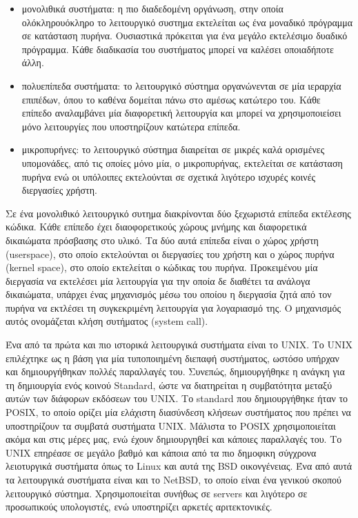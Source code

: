 \begin{itemize}
	\item μονολιθικά συστήματα: η πιο διαδεδομένη οργάνωση, στην οποία
		ολόκληρουόκληρο το λειτουργικό συστημα εκτελείται ως ένα
		μοναδικό πρόγραμμα σε κατάσταση πυρήνα. Ουσιαστικά πρόκειται για
		ένα μεγάλο εκτελέσιμο δυαδικό πρόγραμμα. Κάθε διαδικασία του
		συστήματος μπορεί να καλέσει οποιαδήποτε άλλη. 
	\item πολυεπίπεδα συστήματα: το λειτουργικό σύστημα οργανώνενται σε μία
		ιεραρχία επιπέδων, όπου το καθένα δομείται πάνω στο αμέσως
		κατώτερο του. Κάθε επίπεδο αναλαμβάνει μία διαφορετική
		λειτουργία και μπορεί να χρησιμοποιείσει μόνο λειτουργίες που
		υποστηρίζουν κατώτερα επίπεδα.
	\item μικροπυρήνες: το λειτουργικό σύστημα διαιρείται σε μικρές καλά
		ορισμένες υπομονάδες, από τις οποίες μόνο μία, ο μικροπυρήνας,
		εκτελείται σε κατάσταση πυρήνα ενώ οι υπόλοιπες εκτελούνται σε
		σχετικά λιγότερο ισχυρές κοινές διεργασίες χρήστη.
\end{itemize}

Σε ένα μονολιθικό λειτουργικό συτημα διακρίνονται δύο ξεχωριστά επίπεδα
εκτέλεσης κώδικα. Κάθε επίπεδο έχει διαοφορετικούς χώρους μνήμης και διαφορετικά
δικαιώματα πρόσβασης στο υλικό. Τα δύο αυτά επίπεδα είναι ο χώρος χρήστη
(userspace), στο οποίο εκτελούνται οι διεργασίες του χρήστη και ο χώρος πυρήνα
(kernel space), στο οποίο εκτελείται ο κώδικας του πυρήνα. Προκειμένου μία
διεργασία να εκτελέσει μία λειτουργία για την οποία δε διαθέτει τα ανάλογα
δικαιώματα, υπάρχει ένας μηχανισμός μέσω του οποίου η διεργασία ζητά από τον
πυρήνα να εκτλέσει τη συγκεκριμένη λειτουργία για λογαριασμό της. Ο μηχανισμός
αυτός ονομάζεται κλήση συτήματος (system call). 


Ένα από τα πρώτα και πιο ιστορικά λειτουργικά συστήματα είναι το UNIX. Το UNIX
επιλέχτηκε ως η βάση για μία τυποποιημένη διεπαφή συστήματος, ωστόσο υπήρχαν και
δημιουργήθηκαν πολλές παραλλαγές του. Συνεπώς, δημιουργήθηκε η ανάγκη για τη
δημιουργία ενός κοινού Standard, ώστε να διατηρείται η συμβατότητα μεταξύ αυτών
των διάφορων εκδόσεων του UNIX. Το standard που δημιουργήθηκε ήταν το POSIX, το
οποίο ορίζει μία ελάχιστη διασύνδεση κλήσεων συστήματος που πρέπει να
υποστηρίζουν τα συμβατά συστήματα UNIX. Μάλιστα το POSIX χρησιμοποιείται ακόμα
και στις μέρες μας, ενώ έχουν δημιουργηθεί και κάποιες παραλλαγές του. Το UNIX
επηρέασε σε μεγάλο βαθμό και κάποια από τα πιο δημοφικη σύγχρονα λειοτυργικά
συστήματα όπως το Linux και αυτά της BSD οικονγένειας. Ένα από αυτά τα
λειτουργικά συστήματα είναι και το NetBSD, το οποίο είναι ένα γενικού σκοπού
λειτουργικό σύστημα. Χρησιμοποιείται συνήθως σε servers και λιγότερο σε
προσωπικούς υπολογιστές, ενώ υποστηρίζει αρκετές αριτεκτονικές. 


